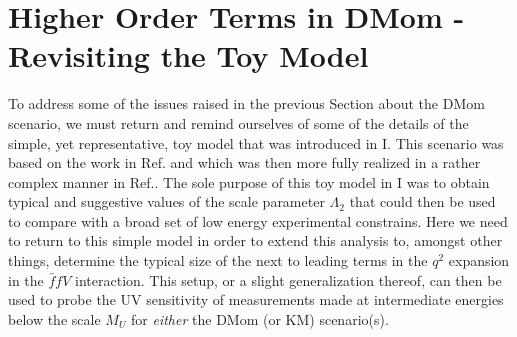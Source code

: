 \documentclass[14pt]{article}
\begin{document}
\section{Higher Order Terms in DMom - Revisiting the Toy Model}

To address some of the issues raised in the previous Section about the DMom scenario, we must return and remind ourselves of some of the details of the simple, yet representative, toy 
model that was introduced in I. This scenario was based on the work in Ref.\cite{Rizzo:2021lob} and which was then more fully realized in a rather complex manner in Ref.\cite{Rizzo:2023qbj}. 
The sole purpose of this toy model in I was to obtain typical and suggestive values of the scale parameter $\Lambda_2$ that could then be used to compare with a broad set of low 
energy experimental constrains. Here we need to return to this simple model in order to extend this analysis to, amongst other things, determine the typical size of the next to leading terms in 
the $q^2$ expansion in the $\bar ffV$ interaction. This setup, or a slight generalization thereof, can then be used to probe the UV sensitivity of measurements made at intermediate energies 
below the scale $M_U$ for {\it either} the DMom (or KM) scenario(s).
\end{document}
